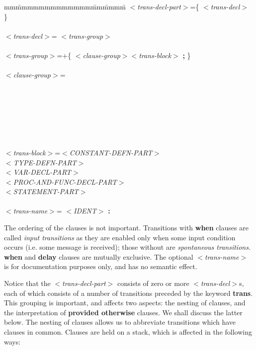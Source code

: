 \begin{tabbing}
mm\=mmmmmmmmmmmmm\=mm\=mmmm\=\+\kill
$<${\em trans-decl-part}$>$\>=\>\{ $<${\em trans-decl}$>$ \}\\
\mbox{}\\
$<${\em trans-decl}$>$\>= $<${\em trans-group}$>$\\
\mbox{}\\
$<${\em trans-group}$>$\>=\>+\{ $<${\em clause-group}$><${\em trans-block}$>$ {\bf ;}
\}\\
\mbox{}\\
$<${\em clause-group}$>$\>=\\
\>\\
\>\>[ $<${\em to-clause}$>$ ]\\
\>\\
\>\\
\>\\
\>\\
\mbox{}\\
$<${\em trans-block}$>$\>=\>$<${\em CONSTANT-DEFN-PART}$>$\\
\>\>$<${\em TYPE-DEFN-PART}$>$\\
\>\>$<${\em VAR-DECL-PART}$>$\\
\>\>$<${\em PROC-AND-FUNC-DECL-PART}$>$\\
\> $<${\em STATEMENT-PART}$>$\\
\mbox{}\\
$<${\em trans-name}$>$\>= $<${\em IDENT}$>$ {\bf :}\\
\end{tabbing}

The ordering of the clauses is not important.
Transitions with {\bf when} clauses are called {\em input
transitions}
as they are enabled only when some input condition occurs
(i.e. some message is received); those without are {\em spontaneous
transitions}. {\bf when} and {\bf delay} clauses are mutually exclusive.
The optional $<${\em trans-name}$>$ is for documentation purposes
only, and has no semantic effect.

Notice that the $<${\em trans-decl-part}$>$ consists of zero or more
$<${\em trans-decl}$>$s, each of which consists of a number of
transitions preceded by the keyword {\bf trans}. This grouping is
important, and affects two aspects: the nesting of clauses, and the
interpretation of {\bf provided otherwise} clauses. We shall discuss
the latter below. The nesting of clauses allows us to abbreviate
transitions which have clauses in common. Clauses are held on a
stack, which is affected in the following ways:

